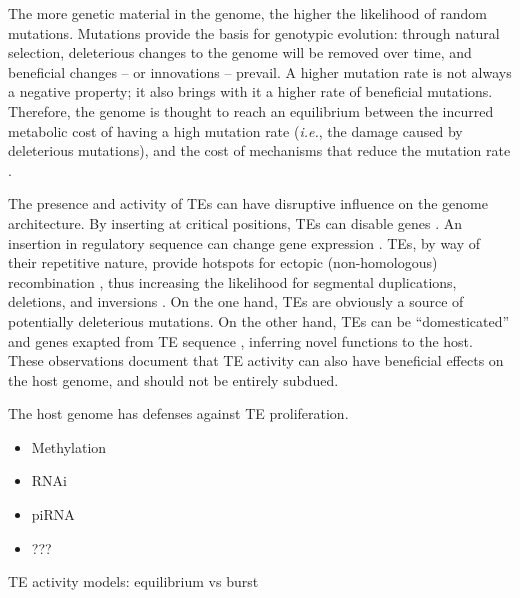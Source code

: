 The more genetic material in the genome, the higher the likelihood of
random mutations. Mutations provide the basis for genotypic evolution:
through natural selection, deleterious changes to the genome will be
removed over time, and beneficial changes -- or innovations -- prevail.
A higher mutation rate is not always a negative property; it also brings
with it a higher rate of beneficial mutations. Therefore, the genome is
thought to reach an equilibrium between the incurred metabolic cost of
having a high mutation rate (\emph{i.e.}, the damage caused by
deleterious mutations), and the cost of mechanisms that reduce the
mutation rate \citep{Bernstein1987, Altenberg2011}.

The presence and activity of TEs can have disruptive influence on the
genome architecture. By inserting at critical positions, TEs can disable
genes \citep{Kazazian1988}. An insertion in regulatory sequence can
change gene expression \citep{Warnefors2010}. TEs, by way of their
repetitive nature, provide hotspots for ectopic (non-homologous)
recombination \citep{Lim1988, Gray2000, Fiston-Lavier2007}, thus
increasing the likelihood for segmental duplications, deletions, and
inversions \citep{Mathiopoulos1998, Remnant2013}. On the one hand, TEs
are obviously a source of potentially deleterious mutations. On the
other hand, TEs can be ``domesticated'' and genes exapted from TE
sequence \citep{Gahan2001, Daborn2002, Aminetzach2005, Chen2007},
inferring novel functions to the host. These observations document that
TE activity can also have beneficial effects on the host genome, and
should not be entirely subdued.

The host genome has defenses against TE proliferation.
\begin{itemize}
\item Methylation \citep{Lisch2009}
\item RNAi
\item piRNA
\item ???
\end{itemize}

TE activity models: equilibrium vs burst
